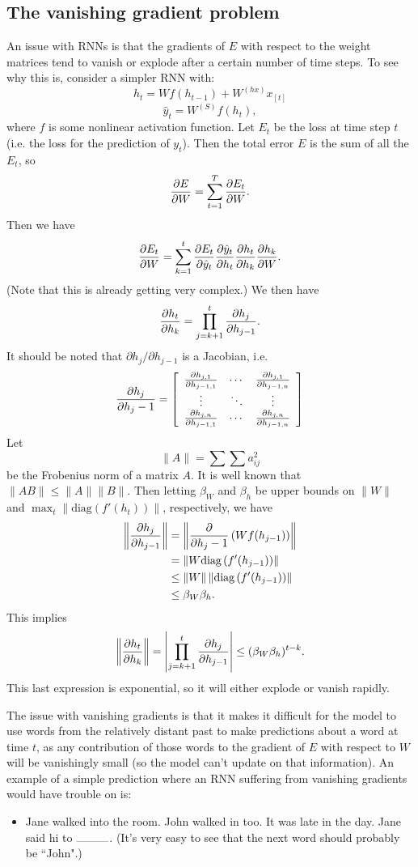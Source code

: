 \subsection{The vanishing gradient problem}
An issue with RNNs is that the gradients of $E$ with respect to the weight matrices tend to vanish or explode after a certain number of time steps. To see why this is, consider a simpler RNN with:
$$h_t = Wf(h_{t-1}) + W^{(hx)}x_{[t]}$$
$$\hat{y}_t = W^{(S)}f(h_t),$$
where $f$ is some nonlinear activation function. Let $E_t$ be the loss at time step $t$ (i.e. the loss for the prediction of $y_t$). Then the total error $E$ is the sum of all the $E_t$, so
$$\frac{\partial E}{\partial W} = \sum_{t=1}^T \frac{\partial E_t}{\partial W}.$$
Then we have
$$\frac{\partial E_t}{\partial W} = \sum_{k=1}^t \frac{\partial E_t}{\partial \hat{y}_t} \frac{\partial \hat{y}_t}{\partial h_t} \frac{\partial h_t}{\partial h_k} \frac{\partial h_k}{\partial W}.$$
(Note that this is already getting very complex.) We then have
$$\frac{\partial h_t}{\partial h_k} = \prod_{j=k+1}^t \frac{\partial h_j}{\partial h_{j-1}}.$$
It should be noted that $\partial h_j / \partial h_{j-1}$ is a Jacobian, i.e.
$$\frac{\partial h_j}{\partial h_j-1} = \left[
\begin{array}{ccc}
\frac{\partial h_{j, 1}}{\partial h_{j-1, 1}} & \cdots & \frac{\partial h_{j, 1}}{\partial h_{j-1, n}} \\
\vdots & \ddots & \vdots \\
\frac{\partial h_{j, n}}{\partial h_{j-1, 1}} & \cdots & \frac{\partial h_{j, n}}{\partial h_{j-1, n}} \\
\end{array}
\right]$$
Let
$$\|A\| = \sum\sum a_{ij}^2$$
be the Frobenius norm of a matrix $A$. It is well known that $\|AB\| \le \|A\|\|B\|.$ Then letting $\beta_W$ and $\beta_h$ be upper bounds on $\|W\|$ and $\max_t \|\text{diag}(f'(h_t))\|$, respectively, we have
\begin{align*}
\left\| \frac{\partial h_j}{\partial h_{j-1}} \right\| &= \left\| \frac{\partial }{\partial h_j-1}\left(Wf(h_{j-1})\right)\right\| \\
&= \left\|W \text{diag}\left(f'(h_{j-1})\right)\right\| \\
&\le \left\|W\right\|\left\| \text{diag}\left(f'(h_{j-1})\right) \right\| \\
&\le \beta_W \beta_h.
\end{align*}
This implies
$$\left\|\frac{\partial h_t}{\partial h_k}\right\| = \left| \prod_{j=k+1}^t \frac{\partial h_j}{\partial h_{j-1}} \right| \le (\beta_W \beta_h)^{t-k}.$$
This last expression is exponential, so it will either explode or vanish rapidly.

The issue with vanishing gradients is that it makes it difficult for the model to use words from the relatively distant past to make predictions about a word at time $t$, as any contribution of those words to the gradient of $E$ with respect to $W$ will be vanishingly small (so the model can't update on that information). An example of a simple prediction where an RNN suffering from vanishing gradients would have trouble on is:
\begin{itemize}
\item Jane walked into the room. John walked in too. It was late in the day. Jane said hi to $\rule{1cm}{0.1mm}$. (It's very easy to see that the next word should probably be ``John".)
\end{itemize}

